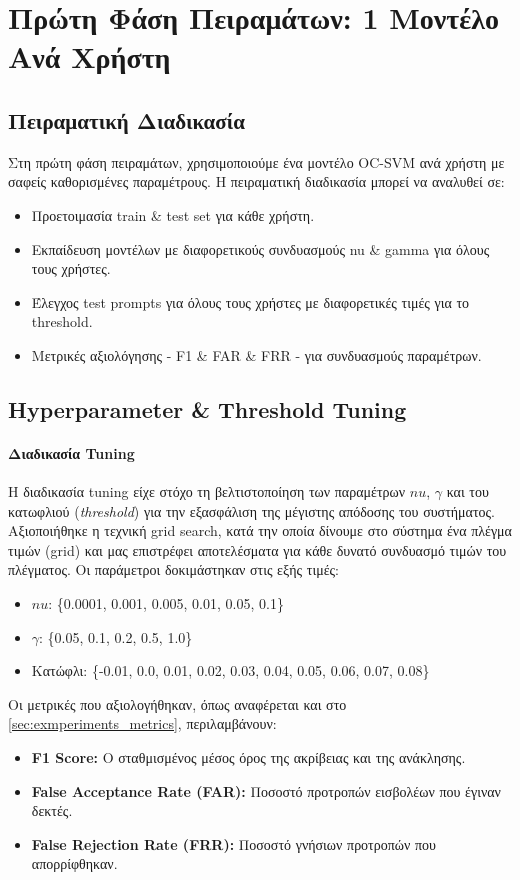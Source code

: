 \section{Πρώτη Φάση Πειραμάτων: 1 Μοντέλο Ανά Χρήστη}
\label{sec:experiments_phase1}

\subsection{Πειραματική Διαδικασία}
Στη πρώτη φάση πειραμάτων, χρησιμοποιούμε ένα μοντέλο OC-SVM ανά χρήστη με σαφείς καθορισμένες παραμέτρους. Η πειραματική διαδικασία μπορεί να αναλυθεί σε:
\begin{itemize}
  \item{Προετοιμασία train \& test set για κάθε χρήστη.}
  \item{Εκπαίδευση μοντέλων με διαφορετικούς συνδυασμούς nu \& gamma για όλους τους χρήστες.}
  \item{Έλεγχος test prompts για όλους τους χρήστες με διαφορετικές τιμές για το threshold.}
  \item{Μετρικές αξιολόγησης - F1 \& FAR \& FRR - για συνδυασμούς παραμέτρων.}
\end{itemize}

\subsection{Hyperparameter \& Threshold Tuning}
\label{subsec:hypertuning}

\paragraph{Διαδικασία Tuning}
Η διαδικασία tuning είχε στόχο τη βελτιστοποίηση των παραμέτρων $nu$, $\gamma$ και του κατωφλιού (\textit{threshold}) για την εξασφάλιση της μέγιστης απόδοσης του συστήματος. Αξιοποιήθηκε η τεχνική grid search, κατά την οποία δίνουμε στο σύστημα ένα πλέγμα τιμών (grid) και μας επιστρέφει αποτελέσματα για κάθε δυνατό συνδυασμό τιμών του πλέγματος. Οι παράμετροι δοκιμάστηκαν στις εξής τιμές:
\begin{itemize}
    \item $nu$: \{0.0001, 0.001, 0.005, 0.01, 0.05, 0.1\}
    \item $\gamma$: \{0.05, 0.1, 0.2, 0.5, 1.0\}
    \item Κατώφλι: \{-0.01, 0.0, 0.01, 0.02, 0.03, 0.04, 0.05, 0.06, 0.07, 0.08\}
\end{itemize}

Οι μετρικές που αξιολογήθηκαν, όπως αναφέρεται και στο \autoref{sec:exmperiments_metrics}, περιλαμβάνουν:
\begin{itemize}
    \item \textbf{F1 Score:} Ο σταθμισμένος μέσος όρος της ακρίβειας και της ανάκλησης.
    \item \textbf{False Acceptance Rate (FAR):} Ποσοστό προτροπών εισβολέων που έγιναν δεκτές.
    \item \textbf{False Rejection Rate (FRR):} Ποσοστό γνήσιων προτροπών που απορρίφθηκαν.
\end{itemize}

